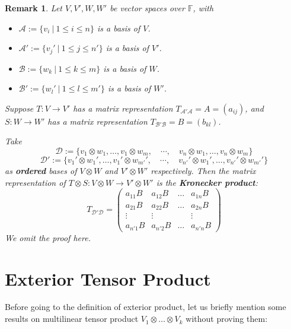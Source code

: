\documentclass[12pt]{amsbook}
\newtheorem{remark}[theorem]{Remark}
\begin{document}
\begin{remark}
    Let $V, V', W, W'$ be vector spaces over $\mathbb{F}$, with
    \begin{itemize}
        \item $\mathcal{A} := \{v_i\ |\ 1 \leq i \leq n\}$ is a basis of $V$.
        \item $\mathcal{A}' := \{v_j' \ |\ 1 \leq j \leq n'\}$ is a basis of $V'$.
        \item $\mathcal{B} := \{w_k \ |\ 1 \leq k \leq m\}$ is a basis of $W$.
        \item $\mathcal{B}' := \{w_l' \ |\ 1 \leq l \leq m'\}$ is a basis of $W'$.
    \end{itemize}
    Suppose $T:V \to V'$ has a matrix representation $T_{\mathcal{A}'\mathcal{A}} = A = (a_{ij})$, and $S: W \to W'$ has a matrix representation $T_{\mathcal{B}'\mathcal{B}} = B = (b_{kl})$. 
    
    Take
    $$\mathcal{D} := \{v_1 \otimes w_1, \dots, v_1 \otimes w_m, \quad \cdots, \quad v_n \otimes w_1, \dots, v_n \otimes w_m\}$$
    $$\mathcal{D}' := \{v_1' \otimes w_1', \dots, v_1' \otimes w_{m'}', \quad \cdots, \quad v_{n'}' \otimes w_1', \dots, v_{n'}' \otimes w_{m'}'\}$$
    as {\bf ordered} bases of  $V \otimes W$ and $V' \otimes W'$ respectively. Then the matrix representation of 
    $T \otimes S: V \otimes W \to V' \otimes W'$ is the {\bf Kronecker product}:
    $$T_{\mathcal{D}'\mathcal{D}} = \begin{pmatrix}
        a_{11}B & a_{12}B & \dots & a_{1n}B \\
        a_{21}B & a_{22}B & \dots & a_{2n}B \\
        \vdots & \vdots & & \vdots \\ 
        a_{n'1}B & a_{n'2}B & \dots & a_{n'n}B 
    \end{pmatrix}$$
    We omit the proof here.
\end{remark}

\section{Exterior Tensor Product}
Before going to the definition of exterior product, let us briefly mention some results on multilinear tensor product $V_1 \otimes \dots \otimes V_k$ without proving them:
\end{document}
